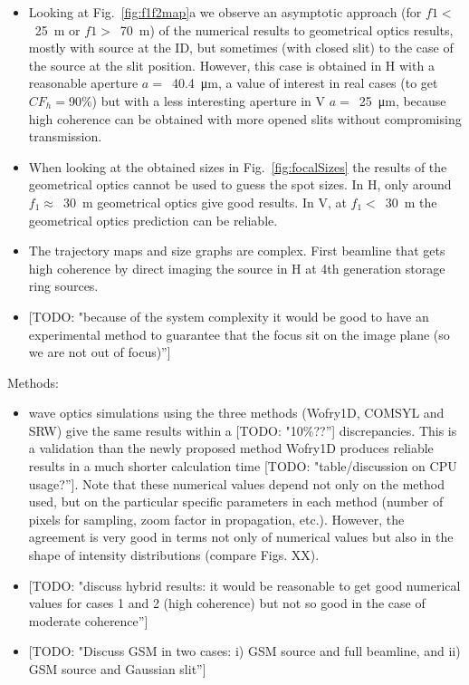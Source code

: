 \documentclass{iucr}              %
\newcommand{\todo}[1]{{\color{red}[TODO: "#1'']}}
\begin{document}
\begin{itemize}
    \item Looking at Fig.~\ref{fig:f1f2map}a we observe an asymptotic approach (for $f1<$~\SI{25}{\meter} or $f1>$~\SI{70}{\meter}) of the numerical results to geometrical optics results, mostly with source at the ID, but sometimes (with closed slit) to the case of the source at the slit position. However, this case is obtained in H with a reasonable aperture $a=$~\SI{40.4}{\micro\meter}, a value of interest in real cases (to get $CF_h=$90\%) but with a less interesting aperture in V $a=$~\SI{25}{\micro\meter}, because high coherence can be obtained with more opened slits without compromising transmission. 
    \item When looking at the obtained sizes in Fig.~\ref{fig:focalSizes} the results of the geometrical optics cannot be used to guess the spot sizes. In H, only around $f_1\approx$~\SI{30}{\meter} geometrical optics give good results. In V, at  $f_1 <$~\SI{30}{\meter} the geometrical optics prediction can be reliable. 
    \item The trajectory maps and size graphs are complex. First beamline that gets high coherence by direct imaging the source in H at 4th generation storage ring sources. 
    \item \todo{because of the system complexity it would be good to have an experimental method to guarantee that the focus sit on the image plane (so we are not out of focus)}
\end{itemize}


    
Methods:
\begin{itemize}
    \item wave optics simulations using the three methods (Wofry1D, COMSYL and SRW) give the same results within a \todo{10\%??} discrepancies. This is a validation than the newly proposed method Wofry1D produces reliable results in a much shorter calculation time \todo{table/discussion on CPU usage?}. Note that these numerical values depend not only on the method used, but on the particular specific parameters in each method (number of pixels for sampling, zoom factor in propagation, etc.). However, the agreement is very good in terms not only of numerical values but also in the shape of intensity distributions (compare Figs. XX).
    \item \todo{discuss hybrid results: it would be reasonable to get good numerical values for cases 1 and 2 (high coherence) but not so good in the case of moderate coherence}
    \item \todo{Discuss GSM in two cases: i) GSM source and full beamline, and ii) GSM source and Gaussian slit}
    
\end{itemize}
\end{document}
